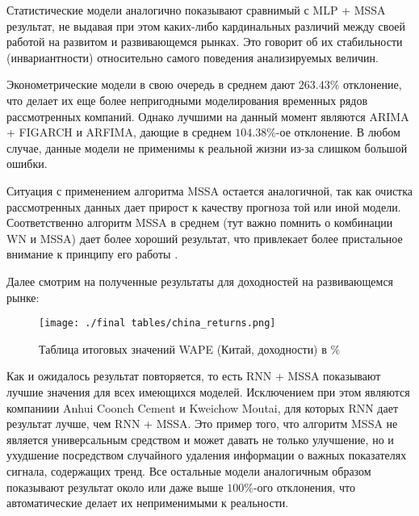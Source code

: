 Статистические модели аналогично показывают сравнимый с MLP + MSSA результат, не выдавая при этом каких-либо кардинальных различий между своей работой на развитом и развивающемся рынках. Это говорит об их стабильности (инвариантности) относительно самого поведения анализируемых величин.

Эконометрические модели в свою очередь в среднем дают $263.43\%$ отклонение, что делает их еще более непригодными моделирования временных рядов рассмотренных компаний. Однако лучшими на данный момент являются ARIMA + FIGARCH и ARFIMA, дающие в среднем $104.38\%$-ое отклонение. В любом случае, данные модели не применимы к реальной жизни из-за слишком большой ошибки.

Ситуация с применением алгоритма MSSA остается аналогичной, так как очистка рассмотренных данных дает прирост к качеству прогноза той или иной модели. Соответственно алгоритм MSSA в среднем (тут важно помнить о комбинации WN и MSSA) дает более хороший результат, что привлекает более пристальное внимание к принципу его работы \cite{kuang2020efficient}. 

\noindent Далее смотрим на полученные результаты для доходностей на развивающемся рынке:

\begin{figure}[H]
	\centering
	\texttt{[image: ./final tables/china\_returns.png]}
	\caption{Таблица итоговых значений WAPE (Китай, доходности) в \%}
	\label{pic::final_table_china_returns}
\end{figure}

\noindent Как и ожидалось результат повторяется, то есть RNN + MSSA показывают лучшие значения для всех имеющихся моделей. Исключением при этом являются компаниии Anhui Coonch Cement и Kweichow Moutai, для которых RNN дает результат лучше, чем RNN + MSSA. Это пример того, что алгоритм MSSA не является универсальным средством и может давать не только улучшение, но и ухудшение посредством случайного удаления информации о важных показателях сигнала, содержащих тренд. Все остальные модели аналогичным образом показывают результат около или даже выше $100\%$-ого отклонения, что автоматические делает их неприменимыми к реальности.

